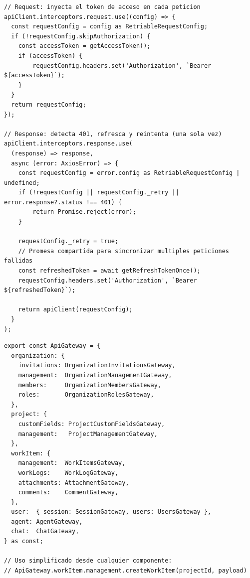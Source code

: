 \begin{lstlisting}[float=htbp, style=TypeScript, caption={Implementación del patrón Proxy mediante interceptores HTTP para inyección y rotación de tokens.}, label={lst:proxy_interceptors}]
// Request: inyecta el token de acceso en cada peticion
apiClient.interceptors.request.use((config) => {
  const requestConfig = config as RetriableRequestConfig;
  if (!requestConfig.skipAuthorization) {
    const accessToken = getAccessToken();
    if (accessToken) {
        requestConfig.headers.set('Authorization', `Bearer ${accessToken}`);
    }
  }
  return requestConfig;
});

// Response: detecta 401, refresca y reintenta (una sola vez)
apiClient.interceptors.response.use(
  (response) => response,
  async (error: AxiosError) => {
    const requestConfig = error.config as RetriableRequestConfig | undefined;
    if (!requestConfig || requestConfig._retry || error.response?.status !== 401) {
        return Promise.reject(error);
    }
    
    requestConfig._retry = true;
    // Promesa compartida para sincronizar multiples peticiones fallidas
    const refreshedToken = await getRefreshTokenOnce();  
    requestConfig.headers.set('Authorization', `Bearer ${refreshedToken}`);
    
    return apiClient(requestConfig);
  }
);
\end{lstlisting}

\begin{lstlisting}[float=htbp, style=TypeScript, caption={Implementación del patrón Facade para agrupar los servicios de llamadas HTTP.}, label={lst:facade_apigateway}]
export const ApiGateway = {
  organization: {
    invitations: OrganizationInvitationsGateway,
    management:  OrganizationManagementGateway,
    members:     OrganizationMembersGateway,
    roles:       OrganizationRolesGateway,
  },
  project: {
    customFields: ProjectCustomFieldsGateway,
    management:   ProjectManagementGateway,
  },
  workItem: {
    management:  WorkItemsGateway,
    workLogs:    WorkLogGateway,
    attachments: AttachmentGateway,
    comments:    CommentGateway,
  },
  user:  { session: SessionGateway, users: UsersGateway },
  agent: AgentGateway,
  chat:  ChatGateway,
} as const;

// Uso simplificado desde cualquier componente:
// ApiGateway.workItem.management.createWorkItem(projectId, payload)
\end{lstlisting}

